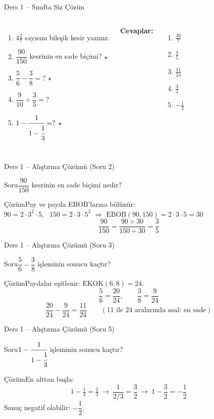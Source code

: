 \documentclass[aspectratio=169,11pt,handout]{beamer}
\newcommand{\soru}[3]{%
\begin{frame}{#1}
  \begin{block}{Soru}\large #2\end{block}
  \pause
  \begin{exampleblock}{Çözüm}\large #3\end{exampleblock}
\end{frame}}
\begin{document}
\begin{frame}{Ders 1 -- Sınıfta Siz Çözün}
\begin{columns}[t]
\begin{enumerate}
\item \(4\frac{2}{7}\) sayısını bileşik kesir yazınız.
\item \(\dfrac{90}{150}\) kesrinin en sade biçimi? \(\star\)
\item \(\dfrac{5}{6}-\dfrac{3}{8}=?\) \(\star\)
\item \(\dfrac{9}{10}\div\dfrac{3}{5}=?\)
\item \(1-\cfrac{1}{1-\cfrac{1}{3}}=?\) \(\star\)
\end{enumerate}
\pause
\textbf{Cevaplar:}
\begin{enumerate}
\item \(\frac{30}{7}\)
\item \(\frac{3}{5}\)
\item \(\frac{11}{24}\)
\item \(\frac{3}{2}\)
\item \(-\frac{1}{2}\)
\end{enumerate}
\end{columns}
\vspace{4pt}{\footnotesize \(\star\) işaretli soruların adım adım çözümü sonraki slaytlardadır.}
\end{frame}

\soru{Ders 1 -- Alıştırma Çözümü (Soru 2)}
{\(\dfrac{90}{150}\) kesrinin en sade biçimi nedir?}
{Pay ve payda EBOB'larına bölünür:\\[3pt]
\(90=2\cdot 3^2\cdot 5\), \ \(150=2\cdot 3\cdot 5^2\) \(\Rightarrow\) \(\text{EBOB}(90,150)=2\cdot 3\cdot 5=30\)
\[\frac{90}{150}=\frac{90\div 30}{150\div 30}=\frac{3}{5}\]}

\soru{Ders 1 -- Alıştırma Çözümü (Soru 3)}
{\(\dfrac{5}{6}-\dfrac{3}{8}\) işleminin sonucu kaçtır?}
{Paydalar eşitlenir: \(\text{EKOK}(6,8)=24\).
\[\frac{5}{6}=\frac{20}{24},\qquad \frac{3}{8}=\frac{9}{24}\]
\[\frac{20}{24}-\frac{9}{24}=\frac{11}{24}\qquad(\text{\(11\) ile \(24\) aralarında asal: en sade})\]}

\soru{Ders 1 -- Alıştırma Çözümü (Soru 5)}
{\(1-\cfrac{1}{1-\cfrac{1}{3}}\) işleminin sonucu kaçtır?}
{En alttan başla:
\[1-\tfrac{1}{3}=\tfrac{2}{3}\ \rightarrow\ \frac{1}{2/3}=\frac{3}{2}\ \rightarrow\ 1-\frac{3}{2}=-\frac{1}{2}\]
Sonuç negatif olabilir: \(-\dfrac{1}{2}\).}
\end{document}
